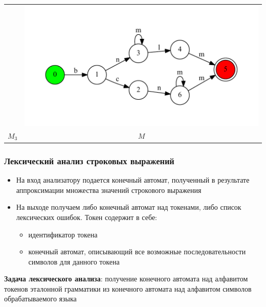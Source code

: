 \documentclass{beamer}
\begin{document}
\begin{frame}[fragile]
\begin{tabular}{c c}
\begin{minipage}{.25\textwidth}
     \end{minipage} 
     &
 	 \begin{minipage}{.65\textwidth} 
     \includegraphics[width=\linewidth]{replace_example}
     \end{minipage} \\     
     $M_3$ & $M$ \\
\end{tabular}
\end{frame}


\begin{frame}
\transwipe[direction=90]
\frametitle{Лексический анализ строковых выражений}
\begin{itemize}
\item На вход анализатору подается конечный автомат, полученный в результате аппроксимации множества значений строкового выражения
\item На выходе получаем либо конечный автомат над токенами, либо список лексических ошибок. Токен содержит в себе:
    \begin{itemize}
    \item идентификатор токена
    \item конечный автомат, описывающий все возможные последовательности символов для данного токена
    \end{itemize}
\end{itemize}

\begin{block}{}
\textbf{Задача лексического анализа}: получение конечного автомата над алфавитом токенов эталонной грамматики из конечного автомата над алфавитом символов обрабатываемого языка
\end{block}

\end{frame}
\end{document}
